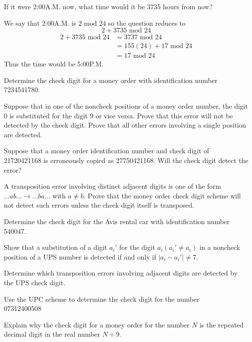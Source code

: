 \documentclass[11pt,largemargins]{homework}
\begin{document}
\question 
If it were 2:00A.M. now, what time would it be 3735 hours from now?

\quad We say that 2:00A.M. is $2\text{ mod }24$ so the question reduces to 
$$2+3735\text{ mod }24$$
\begin{align*}
    2+3735\text{ mod }24 &= 3737\text{ mod }24\\
                         &= 155(24) + 17 \text{ mod }24\\
                         &= 17 \text{ mod }24
\end{align*}
\quad Thus the time would be 5:00P.M.

\question 
Determine the check digit for a money order with identification number 7234541780.

\question 
Suppose that in one of the noncheck positions of a money order number, the digit 0 is substituted for the digit 9 or vice versa.
Prove that this error will not be detected by the check digit. Prove that all other errors involving a single position 
are detected.

\question 
Suppose that a money order identification number and check digit of \\21720421168 is erroneously copied as 27750421168. 
Will the check digit detect the error?

\question 
A transposition error involving distinct adjacent digits is one of the form $...ab...\rightarrow...ba...$ with $a\neq b$. 
Prove that the money order check digit scheme will not detect such errors unless the check digit itself is transposed. 

\question 
Determine the check digit for the Avis rental car with identification number 540047.

\question 
Show that a substitution of a digit $a_i'$ for the digit $a_i(a_i'\neq a_i)$ in a noncheck position of a UPS number is 
detected if and only if $|a_i-a_i'|\neq 7$.

\question 
Determine which transposition errors involving adjacent digits are detected by the UPS check digit.

\question 
Use the UPC scheme to determine the check digit for the number\\ 07312400508

\question 
Explain why the check digit for a money order for the number $N$ is the repeated decimal digit in the real 
number $N\div 9$.
\end{document}
